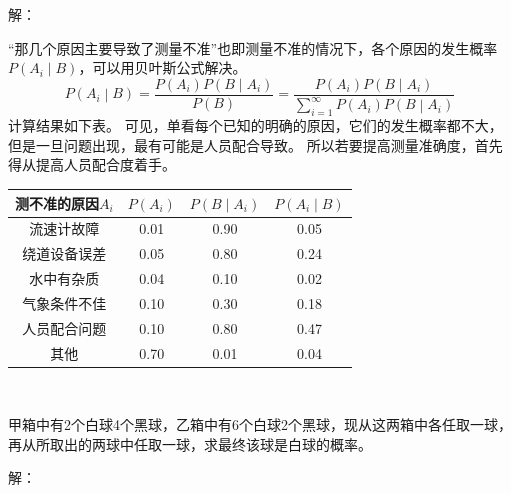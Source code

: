 解：

“那几个原因主要导致了测量不准”也即测量不准的情况下，各个原因的发生概率$P\left( A_i \middle| B \right) $，可以用贝叶斯公式解决。
\[
P\left( A_i \middle| B \right) =\frac{P\left( A_i \right) P\left( B \middle| A_i \right)}{P\left( B \right)}=\frac{P\left( A_i \right) P\left( B \middle| A_i \right)}{\sum_{i=1}^{\infty}{P\left( A_i \right) P\left( B \middle| A_i \right)}}
\]
计算结果如下表。
可见，单看每个已知的明确的原因，它们的发生概率都不大，但是一旦问题出现，最有可能是人员配合导致。
所以若要提高测量准确度，首先得从提高人员配合度着手。
\begin{table}[ht]
    \centering
    \begin{tabular}{cccc}
        \toprule
        测不准的原因$A_i$ & $P\left( A_i \right) $ & $P\left( B \middle| A_i \right) $ & $P\left( A_i \middle| B \right) $\\
        \midrule
        流速计故障 & 0.01 & 0.90 & 0.05\\
        绕道设备误差 & 0.05 & 0.80 & 0.24\\
        水中有杂质 & 0.04 & 0.10 & 0.02\\
        气象条件不佳 & 0.10 & 0.30 & 0.18\\
        人员配合问题 & 0.10 & 0.80 & 0.47\\
        其他 & 0.70 & 0.01 & 0.04\\
        \bottomrule
    \end{tabular}
\end{table}

~

\begin{example}
甲箱中有2个白球4个黑球，乙箱中有6个白球2个黑球，现从这两箱中各任取一球，再从所取出的两球中任取一球，求最终该球是白球的概率。
\end{example}

解：


